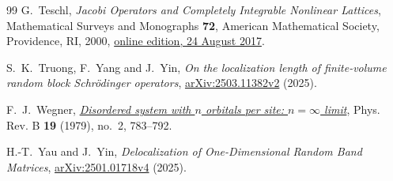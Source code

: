 \documentclass[11pt]{article}
\numberwithin{equation}{section}
\theoremstyle{remark}
\begin{document}
\begin{thebibliography}{99}
G.~Teschl, \emph{Jacobi Operators and Completely Integrable Nonlinear Lattices},
Mathematical Surveys and Monographs \textbf{72}, American Mathematical Society,
Providence, RI, 2000,
\href{https://www.mat.univie.ac.at/~gerald/ftp/book-jac/jacop.pdf}
{online edition, 24 August 2017}.

S.~K.~Truong, F.~Yang and J.~Yin,
\emph{On the localization length of finite-volume random block
Schr\"odinger operators},
\href{https://arxiv.org/abs/2503.11382v2}{arXiv:2503.11382v2} (2025).

F.~J.~Wegner,
\href{https://doi.org/10.1103/PhysRevB.19.783}{\emph{Disordered system with $n$ orbitals per site: $n=\infty$ limit}},
Phys. Rev. B \textbf{19} (1979), no.~2, 783--792.

H.-T.~Yau and J.~Yin,
\emph{Delocalization of One-Dimensional Random Band Matrices},
\href{https://arxiv.org/abs/2501.01718v4}{arXiv:2501.01718v4} (2025).

\end{thebibliography}
\end{document}
